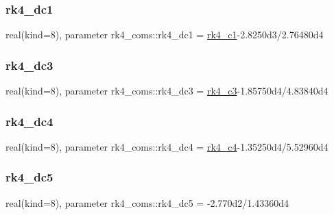 \mbox{\label{namespacerk4__coms_a8f2ecc1ddfd20579092c340f3cde39b4}} 
\subsubsection{\texorpdfstring{rk4\+\_\+dc1}{rk4\_dc1}}
{\footnotesize\ttfamily real(kind=8), parameter rk4\+\_\+coms\+::rk4\+\_\+dc1 = \hyperlink{namespacerk4__coms_a1dd142bdfa35986937ac4396a759dda0}{rk4\+\_\+c1}-\/2.\+8250d3/2.\+76480d4}

\mbox{\label{namespacerk4__coms_ad50fbfa221dd0da30f0c1f4bbc5d4f3e}} 
\subsubsection{\texorpdfstring{rk4\+\_\+dc3}{rk4\_dc3}}
{\footnotesize\ttfamily real(kind=8), parameter rk4\+\_\+coms\+::rk4\+\_\+dc3 = \hyperlink{namespacerk4__coms_a94a604a5d0d271bf875f0fd3338fef3e}{rk4\+\_\+c3}-\/1.\+85750d4/4.\+83840d4}

\mbox{\label{namespacerk4__coms_a1bb5b9bcaddfd294bf37a8ea838adf3f}} 
\subsubsection{\texorpdfstring{rk4\+\_\+dc4}{rk4\_dc4}}
{\footnotesize\ttfamily real(kind=8), parameter rk4\+\_\+coms\+::rk4\+\_\+dc4 = \hyperlink{namespacerk4__coms_ae29e60a0912723f4124b219bb67135d8}{rk4\+\_\+c4}-\/1.\+35250d4/5.\+52960d4}

\mbox{\label{namespacerk4__coms_aa2ab2d5fa0e976ca56e10da08c4409a6}} 
\subsubsection{\texorpdfstring{rk4\+\_\+dc5}{rk4\_dc5}}
{\footnotesize\ttfamily real(kind=8), parameter rk4\+\_\+coms\+::rk4\+\_\+dc5 = -\/2.\+770d2/1.\+43360d4}

